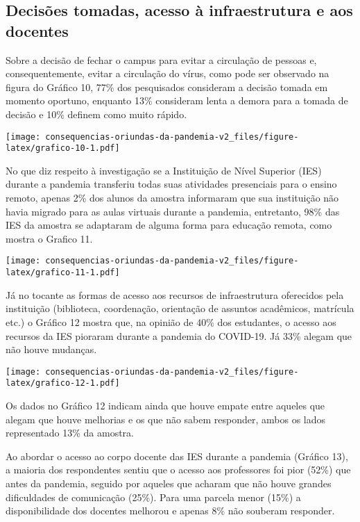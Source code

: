 \documentclass[
]{article}
\begin{document}
\hypertarget{decisuxf5es-tomadas-acesso-uxe0-infraestrutura-e-aos-docentes}{%
\subsection{Decisões tomadas, acesso à infraestrutura e aos
docentes}\label{decisuxf5es-tomadas-acesso-uxe0-infraestrutura-e-aos-docentes}}

Sobre a decisão de fechar o campus para evitar a circulação de pessoas
e, consequentemente, evitar a circulação do vírus, como pode ser
observado na figura do Gráfico 10, 77\% dos pesquisados consideram a
decisão tomada em momento oportuno, enquanto 13\% consideram lenta a
demora para a tomada de decisão e 10\% definem como muito rápido.

\texttt{[image: consequencias-oriundas-da-pandemia-v2\_files/figure-latex/grafico-10-1.pdf]}

No que diz respeito à investigação se a Instituição de Nível Superior
(IES) durante a pandemia transferiu todas suas atividades presenciais
para o ensino remoto, apenas 2\% dos alunos da amostra informaram que
sua instituição não havia migrado para as aulas virtuais durante a
pandemia, entretanto, 98\% das IES da amostra se adaptaram de alguma
forma para educação remota, como mostra o Grafico 11.

\texttt{[image: consequencias-oriundas-da-pandemia-v2\_files/figure-latex/grafico-11-1.pdf]}

Já no tocante as formas de acesso aos recursos de infraestrutura
oferecidos pela instituição (biblioteca, coordenação, orientação de
assuntos acadêmicos, matrícula etc.) o Gráfico 12 mostra que, na opinião
de 40\% dos estudantes, o acesso aos recursos da IES pioraram durante a
pandemia do COVID-19. Já 33\% alegam que não houve mudanças.

\texttt{[image: consequencias-oriundas-da-pandemia-v2\_files/figure-latex/grafico-12-1.pdf]}

Os dados no Gráfico 12 indicam ainda que houve empate entre aqueles que
alegam que houve melhorias e os que não sabem responder, ambos os lados
representado 13\% da amostra.

Ao abordar o acesso ao corpo docente das IES durante a pandemia (Gráfico
13), a maioria dos respondentes sentiu que o acesso aos professores foi
pior (52\%) que antes da pandemia, seguido por aqueles que acharam que
não houve grandes dificuldades de comunicação (25\%). Para uma parcela
menor (15\%) a disponibilidade dos docentes melhorou e apenas 8\% não
souberam responder.
\end{document}
